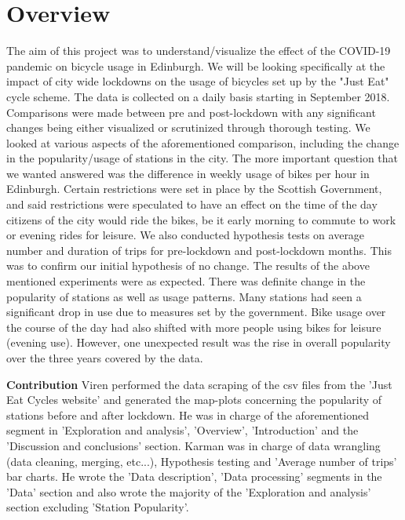 \documentclass[11pt,a4paper]{article}
\begin{document}
\section{Overview}
\vspace{-5mm}
The aim of this project was to understand/visualize the effect of the COVID-19 pandemic on bicycle usage in Edinburgh. We will be looking specifically at the impact of city wide lockdowns on the usage of bicycles set up by the "Just Eat" cycle scheme. The data is collected on a daily basis starting in September 2018. Comparisons were made between pre and post-lockdown with any significant changes being either visualized or scrutinized through thorough testing. We looked at various aspects of the aforementioned comparison, including the change in the popularity/usage of stations in the city. The more important question that we wanted answered was the difference in weekly usage of bikes per hour in Edinburgh. Certain restrictions were set in place by the Scottish Government, and said restrictions were speculated to have an effect on the time of the day citizens of the city would ride the bikes, be it early morning to commute to work or evening rides for leisure. We also conducted hypothesis tests on average number and duration of trips for pre-lockdown and post-lockdown months. This was to confirm our initial hypothesis of no change. The results of the above mentioned experiments were as expected. There was definite change in the popularity of stations as well as usage patterns. Many stations had seen a significant drop in use due to measures set by the government. Bike usage over the course of the day had also shifted with more people using bikes for leisure (evening use). However, one unexpected result was the rise in overall popularity over the three years covered by the data. 
\par
\textbf{Contribution}  Viren performed the data scraping of the csv files from the 'Just Eat Cycles website' and generated the map-plots concerning the popularity of stations before and after lockdown. He was in charge of the aforementioned segment in 'Exploration and analysis', 'Overview', 'Introduction' and the 'Discussion and conclusions' section. Karman was in charge of data wrangling (data cleaning, merging, etc...), Hypothesis testing and 'Average number of trips' bar charts. He wrote the 'Data description', 'Data processing' segments in the 'Data' section and also  wrote the majority of the 'Exploration and analysis' section excluding 'Station Popularity'.
\end{document}
